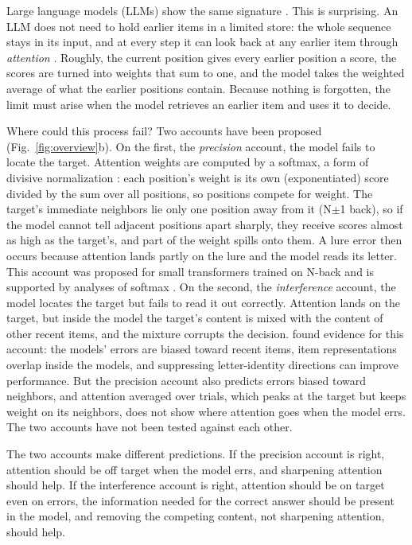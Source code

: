 \documentclass{article}
\begin{document}
Large language models (LLMs) show the same signature \citep{gong2024chatgpt,hu2025nback,xiong2026superposition}. This is surprising. An LLM does not need to hold earlier items in a limited store: the whole sequence stays in its input, and at every step it can look back at any earlier item through \emph{attention} \citep{vaswani2017attention}. Roughly, the current position gives every earlier position a score, the scores are turned into weights that sum to one, and the model takes the weighted average of what the earlier positions contain. Because nothing is forgotten, the limit must arise when the model retrieves an earlier item and uses it to decide.

Where could this process fail? Two accounts have been proposed (Fig.~\ref{fig:overview}b). On the first, the \emph{precision} account, the model fails to locate the target. Attention weights are computed by a softmax, a form of divisive normalization \citep{carandini2012normalization}: each position's weight is its own (exponentiated) score divided by the sum over all positions, so positions compete for weight. The target's immediate neighbors lie only one position away from it (N$\pm$1 back), so if the model cannot tell adjacent positions apart sharply, they receive scores almost as high as the target's, and part of the weight spills onto them. A lure error then occurs because attention lands partly on the lure and the model reads its letter. This account was proposed for small transformers trained on N-back \citep{gong2024selfattention} and is supported by analyses of softmax \citep{velickovic2025softmax}. On the second, the \emph{interference} account, the model locates the target but fails to read it out correctly. Attention lands on the target, but inside the model the target's content is mixed with the content of other recent items, and the mixture corrupts the decision. \citet{xiong2026superposition} found evidence for this account: the models' errors are biased toward recent items, item representations overlap inside the models, and suppressing letter-identity directions can improve performance. But the precision account also predicts errors biased toward neighbors, and attention averaged over trials, which peaks at the target but keeps weight on its neighbors, does not show where attention goes when the model errs. The two accounts have not been tested against each other.

The two accounts make different predictions. If the precision account is right, attention should be off target when the model errs, and sharpening attention should help. If the interference account is right, attention should be on target even on errors, the information needed for the correct answer should be present in the model, and removing the competing content, not sharpening attention, should help.
\end{document}

